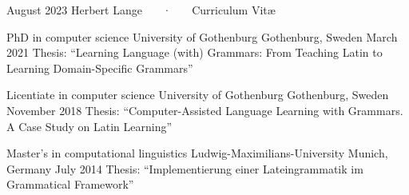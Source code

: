 \documentclass[11pt, a4]{academic-cv}
\begin{document}
\makecvheader
\makecvfooter
{ August 2023 }
{ Herbert Lange ~~~·~~~ Curriculum Vit\ae}
{\thepage}


\vspace{-10px}

\begin{cventries}
\cventry
{PhD in computer science} %
{ University of Gothenburg} %
{Gothenburg, Sweden} %
{March 2021} %
{Thesis: ``Learning Language (with) Grammars: From Teaching Latin to Learning Domain-Specific Grammars''}

\cventry
{Licentiate in computer science} %
{ University of Gothenburg} %
{Gothenburg, Sweden} %
{November 2018} %
{Thesis: ``Computer-Assisted Language Learning with Grammars. A Case Study on Latin Learning''}

\cventry
{Master's in computational linguistics} %
{ Ludwig-Maximilians-University} %
{Munich, Germany} %
{July 2014} %
{Thesis: ``Implementierung einer Lateingrammatik im Grammatical Framework''}


\end{cventries}
\vspace{-10px}
\end{document}
